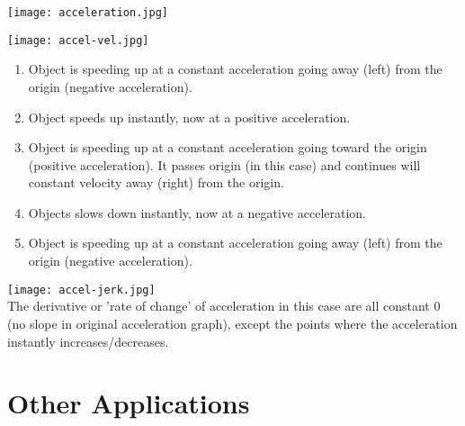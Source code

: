\documentclass[12pt,fleqn]{book} %
\begin{document}
\begin{multicols}{2}
    \texttt{[image: acceleration.jpg]} \\
    \begin{center}

        \texttt{[image: accel-vel.jpg]}
        \begin{enumerate}[label=(\alph*)]
            \item Object is speeding up at a constant acceleration going away (left) from the origin (negative acceleration).
            \item Object speeds up instantly, now at a positive acceleration.
            \item Object is speeding up at a constant acceleration going toward the origin (positive acceleration). It passes origin (in this case) and continues  will constant velocity away (right) from the origin.
            \item Objects slows down instantly, now at a negative acceleration.
            \item Object is speeding up at a constant acceleration going away (left) from the origin (negative acceleration).
        \end{enumerate}

    \end{center}
    \columnbreak

    \hspace*{-20mm}

    \begin{center}
        \vspace*{10mm}
        \texttt{[image: accel-jerk.jpg]} \\
        The derivative or 'rate of change' of acceleration in this case are all constant 0 (no slope in original acceleration graph), except the points where the acceleration instantly increases/decreases.

    \end{center}
\end{multicols}

\pagebreak


\section{Other Applications}
\end{document}

